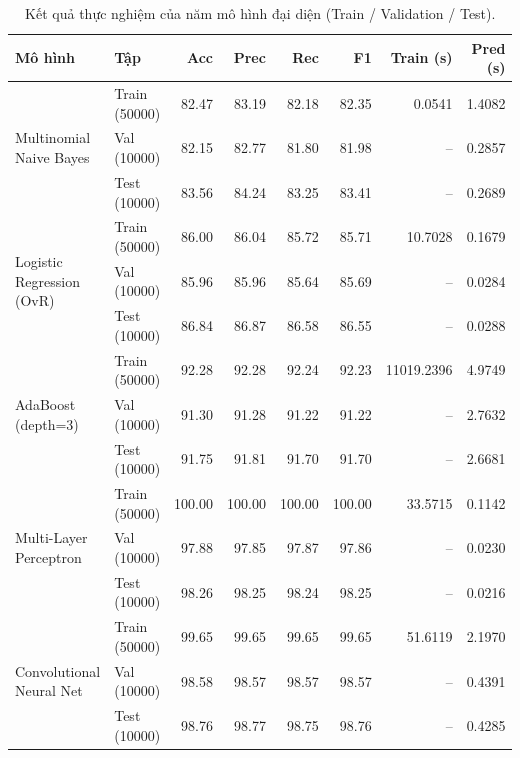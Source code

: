 \documentclass[11pt,a4paper]{article}
\begin{document}
\begin{table}[H]
\centering\scriptsize
\caption{Kết quả thực nghiệm của năm mô hình đại diện (Train / Validation / Test).}
\renewcommand{\arraystretch}{1.05}
\begin{tabular}{llrrrrrr}
\toprule
\textbf{Mô hình}&\textbf{Tập}&\textbf{Acc}&\textbf{Prec}&\textbf{Rec}&\textbf{F1}&\textbf{Train (s)}&\textbf{Pred (s)}\\
\midrule
\multirow{3}{*}{Multinomial Naive Bayes}&Train (50000)&82.47&83.19&82.18&82.35&0.0541&1.4082\\
&Val (10000)&82.15&82.77&81.80&81.98&--&0.2857\\
&Test (10000)&83.56&84.24&83.25&83.41&--&0.2689\\\midrule
\multirow{3}{*}{Logistic Regression (OvR)}&Train (50000)&86.00&86.04&85.72&85.71&10.7028&0.1679\\
&Val (10000)&85.96&85.96&85.64&85.69&--&0.0284\\
&Test (10000)&86.84&86.87&86.58&86.55&--&0.0288\\\midrule
\multirow{3}{*}{AdaBoost (depth=3)}&Train (50000)&92.28&92.28&92.24&92.23&11019.2396&4.9749\\
&Val (10000)&91.30&91.28&91.22&91.22&--&2.7632\\
&Test (10000)&91.75&91.81&91.70&91.70&--&2.6681\\\midrule
\multirow{3}{*}{Multi-Layer Perceptron}&Train (50000)&100.00&100.00&100.00&100.00&33.5715&0.1142\\
&Val (10000)&97.88&97.85&97.87&97.86&--&0.0230\\
&Test (10000)&98.26&98.25&98.24&98.25&--&0.0216\\\midrule
\multirow{3}{*}{Convolutional Neural Net}&Train (50000)&99.65&99.65&99.65&99.65&51.6119&2.1970\\
&Val (10000)&98.58&98.57&98.57&98.57&--&0.4391\\
&Test (10000)&98.76&98.77&98.75&98.76&--&0.4285\\
\bottomrule
\end{tabular}
\end{table}
\end{document}
